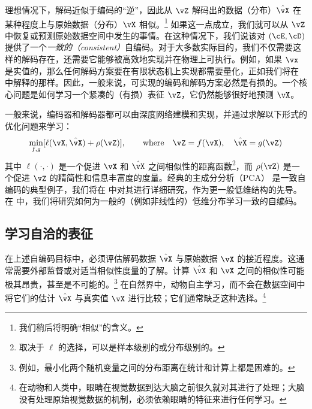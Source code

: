 \documentclass[../../book-main_zh.tex]{subfiles}
\begin{document}
理想情况下，解码近似于编码的“逆”，因此从 \(\vZ\) 解码出的数据（分布）\(\hat{\vX}\)
在某种程度上与原始数据（分布）\(\vX\) 相似。\footnote{我们稍后将明确“相似”的含义。} 如果这一点成立，我们就可以从
\(\vZ\) 中恢复或预测原始数据空间中发生的事情。在这种情况下，我们说该对 \((\cE, \cD)\)
提供了一个\textit{一致的（consistent）}自编码。对于大多数实际目的，我们不仅需要这样的解码存在，还需要它能够被高效地实现并在物理上可执行。例如，如果
\(\vx\) 是实值的，那么任何解码方案要在有限状态机上实现都需要量化，正如我们将在
中解释的那样。因此，一般来说，可实现的编码和解码方案必然是有损的。一个核心问题是如何学习一个紧凑的（有损）表征
\(\vZ\)，它仍然能够很好地预测 \(\vX\)。

一般来说，编码器和解码器都可以由深度网络建模和实现，并通过求解以下形式的优化问题来学习：
\begin{equation}
    \min_{f, g} [\ell(\vX, \hat{\vX}) + \rho(\vZ)], \qquad
    \text{where} \quad \vZ = f(\vX), \quad \hat{\vX} = g(\vZ)
    \label{eqn:auto-encoding-objective}
\end{equation}
其中 \(\ell(\cdot, \cdot)\) 是一个促进 \(\vX\) 和 \(\hat{\vX}\)
之间相似性的距离函数\footnote{取决于 \(\ell\) 的选择，可以是样本级别的或分布级别的。}，而 \(\rho(\vZ)\)
是一个促进 \(\vZ\) 的精简性和信息丰富度的度量。经典的主成分分析（PCA）\cite{JolliffeI2002}
是一致自编码的典型例子，我们将在  中对其进行详细研究，作为更一般低维结构的先导。在
 中，我们将研究如何为一般的（例如非线性的）低维分布学习一致的自编码。

\subsection{学习自洽的表征}
在上述自编码目标中，必须评估解码数据 \(\hat{\vX}\) 与原始数据 \(\vX\)
的接近程度。这通常需要外部监督或对适当相似性度量的了解。计算 \(\hat{\vX}\) 和 \(\vX\)
之间的相似性可能极其昂贵，甚至是不可能的。\footnote{例如，最小化两个随机变量之间的分布距离在统计和计算上都是困难的。}
在自然界中，动物自主学习，而不会在数据空间中将它们的估计 \(\hat{\vX}\) 与真实值 \(\vX\)
进行比较；它们通常缺乏这种选择。\footnote{在动物和人类中，眼睛在视觉数据到达大脑之前很久就对其进行了处理；大脑没有处理原始视觉数据的机制，必须依赖眼睛的特征来进行任何学习。}
\end{document}

